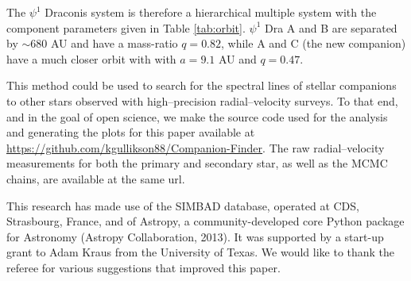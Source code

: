 \documentclass[twocolumn]{emulateapj}
\begin{document}
The $\psi^1$ Draconis system is therefore a hierarchical multiple system with the component parameters given in Table \ref{tab:orbit}. $\psi^1$ Dra A and B are separated by ${\sim}680$ AU and have a mass-ratio $q = 0.82$, while A and C (the new companion) have a much closer orbit with with $a = 9.1$ AU and $q = 0.47$. 

This method could be used to search for the spectral lines of stellar companions to other stars observed with high--precision radial--velocity surveys. To that end, and in the goal of open science, we make the source code used for the analysis and generating the plots for this paper available at \url{https://github.com/kgullikson88/Companion-Finder}. The raw radial--velocity measurements for both the primary and secondary star, as well as the MCMC chains, are available at the same url.

This research has made use of the SIMBAD database, operated at CDS, Strasbourg, France, and of Astropy, a community-developed core Python package for Astronomy (Astropy Collaboration, 2013).
It was supported by a start-up grant to Adam Kraus from the University of Texas. We would like to thank the referee for various suggestions that improved this paper.



\newpage

\end{document}
